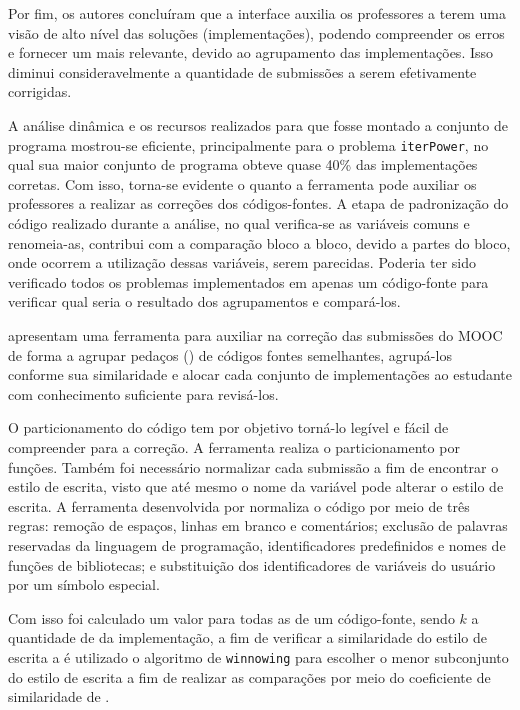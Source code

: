 		Por fim, os autores concluíram que a interface auxilia os professores a terem
		uma visão de alto nível das soluções (implementações), podendo compreender os
		erros e fornecer um  mais relevante, devido ao agrupamento
		das implementações. Isso diminui consideravelmente a quantidade de submissões
		a serem efetivamente corrigidas.
		
		A análise dinâmica e os recursos realizados para que fosse montado a conjunto de programa
		mostrou-se eficiente, principalmente para o problema \texttt{iterPower}, no
		qual sua maior conjunto de programa obteve quase 40\% das implementações corretas. Com isso,
		torna-se evidente o quanto a ferramenta pode auxiliar os professores a realizar
		as correções dos códigos-fontes. A etapa de padronização do código realizado
		durante a análise, no qual verifica-se as variáveis comuns e renomeia-as,
		contribui com a comparação bloco a bloco, devido a partes do bloco, onde
		ocorrem a utilização dessas variáveis, serem parecidas. Poderia ter sido
		verificado todos os problemas implementados em apenas um código-fonte para
		verificar qual seria o resultado dos agrupamentos e compará-los.
		
		 apresentam uma ferramenta para auxiliar na correção das
		submissões do \acs{MOOC} de forma a agrupar pedaços () de códigos
		fontes semelhantes, agrupá-los conforme sua similaridade e alocar cada conjunto
		de implementações ao estudante com conhecimento suficiente para revisá-los.
		
		O particionamento do código tem por objetivo torná-lo legível e fácil de
		compreender para a correção. A ferramenta realiza o particionamento por funções.
		Também foi necessário normalizar cada submissão a fim de encontrar o estilo de
		escrita, visto que até mesmo o nome da variável pode alterar o estilo de escrita.
		A ferramenta desenvolvida por  normaliza o código por meio
		de três regras: remoção de espaços, linhas em branco e comentários; exclusão
		de palavras reservadas da linguagem de programação, identificadores predefinidos
		e nomes de funções de bibliotecas; e substituição dos identificadores de
		variáveis do usuário por um símbolo especial.
		
		Com isso foi calculado um valor  para todas as 
		de um código-fonte, sendo $k$ a quantidade de  da implementação,
		a fim de verificar a similaridade do estilo de escrita  a
		 é utilizado o algoritmo de \texttt{winnowing} \cite{schleimer2003}
		para escolher o menor subconjunto do estilo de escrita a fim de realizar as
		comparações por meio do coeficiente de similaridade de  \cite{jaccard1901}.
		
